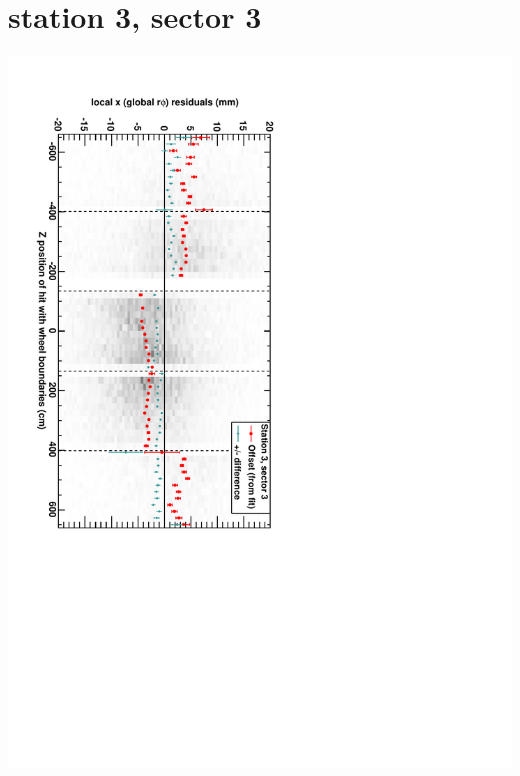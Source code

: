 \documentclass[compress]{beamer}
\begin{document}
\section*{station 3, sector 3}
\begin{frame} \vfill \mbox{\hspace{-1 cm}\includegraphics[height=1.2\linewidth, angle=90]{DTrphiVsZ_st3_sr03.pdf}} \end{frame}
\end{document}
